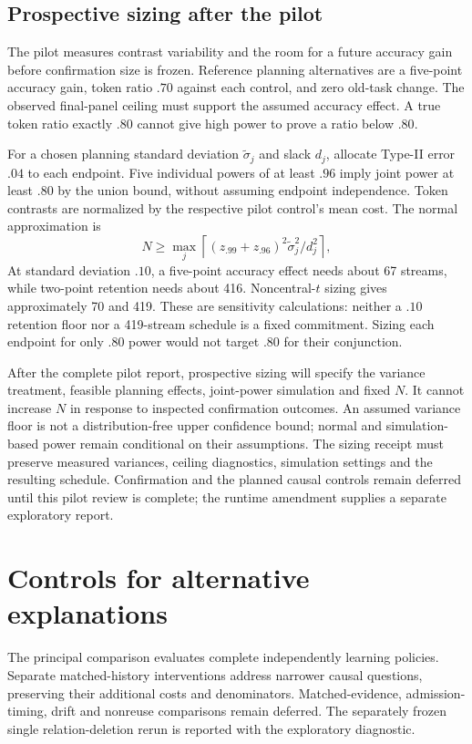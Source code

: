 \documentclass[10pt,twocolumn]{article}
\begin{document}
\subsection{Prospective sizing after the pilot}
The pilot measures contrast variability and the room for a future accuracy
gain before confirmation size is frozen. Reference planning alternatives are
a five-point accuracy gain, token ratio $.70$ against each control, and zero
old-task change. The observed final-panel ceiling must support the assumed
accuracy effect. A true token ratio exactly $.80$ cannot give high power to
prove a ratio below $.80$.

For a chosen planning standard deviation $\widetilde\sigma_j$ and slack $d_j$,
allocate Type-II error $.04$ to each endpoint. Five individual powers of at
least $.96$ imply joint power at least $.80$ by the union bound, without assuming
endpoint independence. Token contrasts are normalized by the respective pilot
control's mean cost. The normal approximation is
\begin{equation}
N\ge\max_j\left\lceil
(z_{.99}+z_{.96})^2\widetilde\sigma_j^2/d_j^2
\right\rceil,
\end{equation}
At standard deviation $.10$, a five-point accuracy effect needs about 67
streams, while two-point retention needs about 416. Noncentral-$t$ sizing gives
approximately 70 and 419. These are sensitivity calculations: neither a $.10$
retention floor nor a 419-stream schedule is a fixed commitment. Sizing each
endpoint for only $.80$ power would not target $.80$ for their conjunction.

After the complete pilot report, prospective sizing will specify the variance
treatment, feasible planning effects, joint-power simulation and fixed $N$.
It cannot increase $N$ in response to inspected confirmation outcomes. An
assumed variance floor is not a distribution-free upper confidence bound;
normal and simulation-based power remain conditional on their assumptions.
The sizing receipt must preserve measured variances, ceiling diagnostics,
simulation settings and the resulting schedule. Confirmation and the planned
causal controls remain deferred until this pilot review is complete; the runtime
amendment supplies a separate exploratory report.

\section{Controls for alternative explanations}
The principal comparison evaluates complete independently learning policies.
Separate matched-history interventions address narrower causal questions,
preserving their additional costs and denominators. Matched-evidence,
admission-timing, drift and nonreuse comparisons remain deferred. The separately
frozen single relation-deletion rerun is reported with the exploratory diagnostic.
\end{document}
